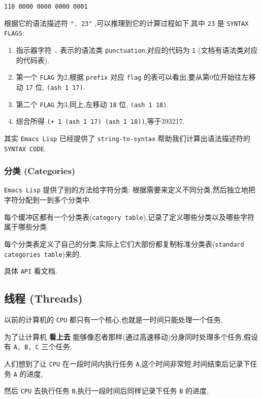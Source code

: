 \documentclass[11pt]{article}
\begin{document}
\texttt{110 0000 0000 0000 0001}

根据它的语法描述符 \texttt{". 23"} ,可以推理到它的计算过程如下,其中 \texttt{23} 是 \texttt{SYNTAX FLAGS}:

\begin{enumerate}
\item 指示器字符 \texttt{.} 表示的语法类 \texttt{punctuation},对应的代码为 \texttt{1} (文档有语法类对应的代码表).
\item 第一个 \texttt{FLAG} 为2,根据 \texttt{prefix} 对应 \texttt{flag} 的表可以看出,要从第0位开始往左移动 \texttt{17} 位, \texttt{(ash 1 17)}.
\item 第二个 \texttt{FLAG} 为3,同上,左移动 \texttt{18} 位, \texttt{(ash 1 18)}.
\item 综合所得 \texttt{(+ 1 (ash 1 17) (ash 1 18))},等于393217.
\end{enumerate}

其实 \texttt{Emacs Lisp} 已经提供了 \texttt{string-to-syntax} 帮助我们计算出语法描述符的 \texttt{SYNTAX CODE}.


\subsubsection{分类 (Categories)}
\label{sec:orge469d71}

\texttt{Emacs Lisp} 提供了别的方法给字符分类: 根据需要来定义不同分类,然后独立地把字符分配到一到多个分类中.

每个缓冲区都有一个分类表(\texttt{category table}),记录了定义哪些分类以及哪些字符属于哪些分类.

每个分类表定义了自己的分类,实际上它们大部份都复制标准分类表(\texttt{standard categories table})来的.

具体 \texttt{API} 看文档.


\subsection{线程 (Threads)}
\label{sec:org67b4a3d}

以前的计算机的 \texttt{CPU} 都只有一个核心,也就是一时间只能处理一个任务,

为了让计算机 \textbf{看上去} 能够像忍者那样(通过高速移动)分身同时处理多个任务,假设有 \texttt{A, B, C} 三个任务,

人们想到了让 \texttt{CPU} 在一段时间内执行任务 \texttt{A},这个时间非常短,时间结束后记录下任务 \texttt{A} 的进度,

然后 \texttt{CPU} 去执行任务 \texttt{B},执行一段时间后同样记录下任务 \texttt{B} 的进度,
\end{document}
